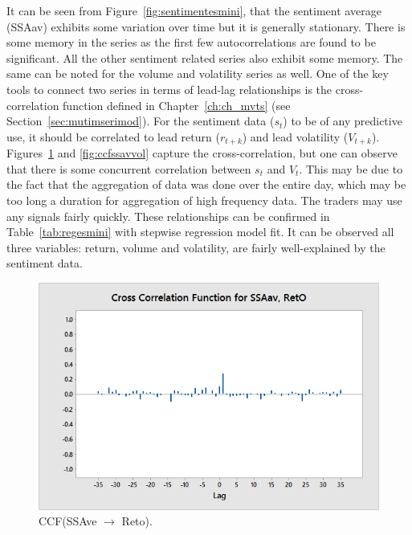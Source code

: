 It can be seen from Figure~\ref{fig:sentimentesmini}, that the sentiment average (SSAav) exhibits some variation over time but it is generally stationary. There is some memory in the series as the first few autocorrelations are found to be significant. All the other sentiment related series also exhibit some memory. The same can be noted for the volume and volatility series as well. One of the key tools to connect two series in terms of lead-lag relationships is the cross-correlation function defined in Chapter~\ref{ch:ch_mvts} (see Section~\ref{sec:mutimserimod}). For the sentiment data ($s_t$) to be of any predictive use, it should be correlated to lead return ($r_{t+k}$) and lead volatility ($V_{t+k}$). Figures~\ref{fig:ccfssavreto} and \ref{fig:ccfssavvol} capture the cross-correlation, but one can observe that there is some concurrent correlation between $s_t$ and $V_t$. This may be due to the fact that the aggregation of data was done over the entire day, which may be too long a duration for aggregation of high frequency data. The traders may use any signals fairly quickly. These relationships can be confirmed in Table~\ref{tab:regesmini} with stepwise regression model fit. It can be observed all three variables: return, volume and volatility, are fairly well-explained by the sentiment data. 


	\begin{figure}[!ht]
	\centering
	\includegraphics[width=\textwidth]{chapters/chapter_news_an/figures/ch4sec4crossfssaavreto} 
	\caption{CCF(SSAve $\rightarrow$ Reto). \label{fig:ccfssavreto}}
	\end{figure}

